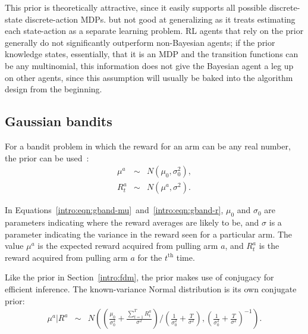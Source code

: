 This prior is theoretically attractive, since it easily supports all possible discrete-state discrete-action MDPs. but not good at generalizing as it treats estimating each state-action as a separate learning problem.   RL agents that rely on the  prior generally do not significantly outperform non-Bayesian agents\note{[ref?]}; if the prior knowledge states, essentially, that it is an MDP and the transition functions can be any multinomial, this information does not give the Bayesian agent a leg up on other agents, since this assumption will usually be baked into the algorithm design from the beginning. 

\subsection{Gaussian bandits}

For a bandit problem in which the reward for an arm can be any real number, the  prior can be used~\cite{wang05}:
\begin{eqnarray}
\label{intro:eqn:gband-mu}\mu^a &\sim& N(\mu_0, \sigma^2_0),\\
\label{intro:eqn:gband-r}R_t^a &\sim& N(\mu^a, \sigma^2).
\end{eqnarray}

In Equations~\ref{intro:eqn:gband-mu}~and~\ref{intro:eqn:gband-r}, $\mu_0$ and $\sigma_0$ are parameters indicating where the reward averages are likely to be, and $\sigma$ is a parameter indicating the variance in the reward seen for a particular arm. The value $\mu^a$ is the expected reward acquired from pulling arm $a$, and $R_t^a$ is the reward acquired from pulling arm $a$ for the $t^{\mbox{th}}$ time.

Like the  prior in Section~\ref{intro:fdm}, the  prior makes use of conjugacy for efficient inference. The known-variance Normal distribution is its own conjugate prior:
\begin{eqnarray}
\label{intro:eqn:gband-post}\mu^a|R^a &\sim& N\left(\left(\frac{\mu_0}{\sigma_0^2} + \frac{\sum_{t=1}^T R_t^a}{\sigma^2}\right)/\left(\frac 1 {\sigma_0^2} + \frac T {\sigma^2} \right), \left(\frac 1 {\sigma_0^2} + \frac T {\sigma^2} \right)^{-1}\right).
\end{eqnarray}

